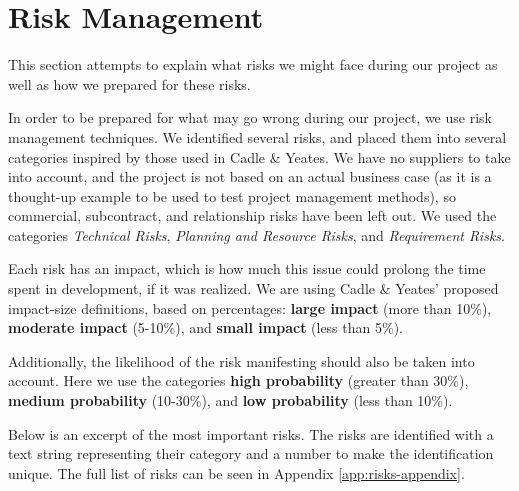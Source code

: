\section{Risk Management}
This section attempts to explain what risks we might face during our project as well as how we prepared for these risks.
\label{sec:EmpiriRiskManagement}
\label{sec:RiskManagement}

In order to be prepared for what may go wrong during our project, we use risk management techniques.
We identified several risks, and placed them into several categories inspired by those used in Cadle
\& Yeates\cite{caye}. We have no suppliers to take into account, and the project is not
based on an actual business case (as it is a thought-up example to be used to test project management
methods), so commercial, subcontract, and relationship risks have been left out. We used the categories
\emph{Technical Risks}, \emph{Planning and Resource Risks}, and \emph{Requirement Risks}.

Each risk has an impact, which is how much this issue could prolong the time spent in development,
if it was realized. We are using Cadle \& Yeates' proposed impact-size definitions, based on percentages:
\textbf{large impact} (more than 10\%), \textbf{moderate impact} (5-10\%), and \textbf{small impact}
(less than 5\%).

Additionally, the likelihood of the risk manifesting should also be taken into account. Here we use the
categories \textbf{high probability} (greater than 30\%), \textbf{medium probability} (10-30\%), and
\textbf{low probability} (less than 10\%).

Below is an excerpt of the most important risks. The risks are
identified with a text string representing their category and a number to make the identification unique. The
full list of risks can be seen in Appendix \ref{app:risks-appendix}.

